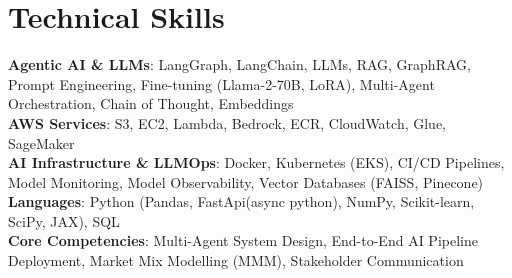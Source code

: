 \section{Technical Skills}
 \begin{itemize}[leftmargin=0.15in, label={}]
    \small{\item{
     \textbf{Agentic AI \& LLMs}{: LangGraph, LangChain, LLMs, RAG, GraphRAG, Prompt Engineering, Fine-tuning (Llama-2-70B, LoRA), Multi-Agent Orchestration, Chain of Thought, Embeddings} \\
     \textbf{AWS Services}{: S3, EC2, Lambda, Bedrock, ECR, CloudWatch, Glue, SageMaker} \\
     \textbf{AI Infrastructure \& LLMOps}{: Docker, Kubernetes (EKS), CI/CD Pipelines, Model Monitoring, Model Observability, Vector Databases (FAISS, Pinecone)} \\
     \textbf{Languages}{: Python (Pandas, FastApi(async python), NumPy, Scikit-learn, SciPy, JAX), SQL} \\
     \textbf{Core Competencies}{: Multi-Agent System Design, End-to-End AI Pipeline Deployment, Market Mix Modelling (MMM), Stakeholder Communication}
    }}
 \end{itemize}
